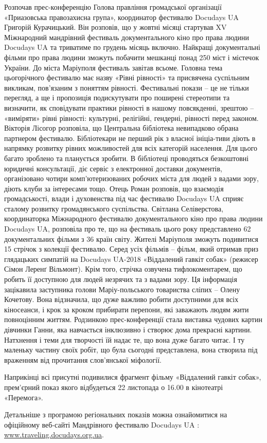 Розпочав прес-конференцію Голова правління громадської організації «Приазовська
правозахисна група», координатор фестивалю Docudays UA  Григорій Курачицький.
Він розповів, що у  жовтні місяці  стартував  XV Міжнародний  мандрівний
фестиваль документального кіно про права людини Docudays UA та триватиме по
грудень місяць включно. Найкращі документальні фільми про права людини зможуть
побачити мешканці понад 250 міст і містечок  України.  До міста Маріуполя
фестиваль завітав всьоме. Головна тема цьогорічного фестивалю має назву «Рівні
рівності» та присвячена суспільним викликам, пов'язаним з поняттям рівності.
Фестивальні покази – це не тільки перегляд, а ще і  пропозиція подискутувати
про поширені стереотипи та визначити, як сповідувати практики рівності в нашому
повсякденні, зрештою – «виміряти» рівні рівності: культурні, релігійні,
гендерні, рівності перед законом. Вікторія Лісогор розповіла, що Центральна
бібліотека невипадково обрана партнером фестивалю.  Бібліотекари не перший рік
з власної ініціа-тиви діють в напрямку розвитку рівних можливостей для всіх
категорій населення. Для цього багато зроблено та планується зробити. В
бібліотеці проводяться безкоштовні юридичні консультації, діє сервіс з
електронної доставки документів, організовано чотири комп'ютеризованих робочих
міста для людей з вадами зору, діють клуби за інтересами тощо. Отець Роман
розповів, що взаємодія громадськості, влади і духовенства під час фестивалю
Docudays UA  сприяє сталому розвитку громадянського суспільства. Світлана
Селіверстова, координаторка Міжнародного фестивалю документального кіно про
права людини Docudays UA,  розповіла про те, що на фестиваль цього року
представлено 62 документальних фільми з 36 країн світу. Жителі Маріуполя
зможуть подивитися 15 стрічок з колекції фестивалю. Серед усіх фільмів – фільм,
який отримав приз глядацьких симпатій на Docudays UA-2018 «Віддалений гавкіт
собак» (режисер Сімон Леренґ Вільмонт). Крім того, стрічка озвучена
тифлокоментарем, що робить її доступною для людей незрячих та з вадами зору. Ця
інформація зацікавила заступника голови Маріу-польського товариства сліпих –
Олену Кочетову. Вона відзначила, що дуже важливо робити доступними для всіх
кіносеанси, і крок за кроком прибирати перепони, які заважають людям жити
повноцінним життям. Родзинкою прес-конференції стала виставка чудових картин
дівчинки Ганни, яка навчається інклюзивно і створює дома прекрасні картини.
Натхнення і теми для творчості їй надає те, що вона дуже багато читає. І ту
маленьку частину своїх робіт, що була сьогодні представлена, вона створила під
враженням від прочитання слов'янської міфології. 

Наприкінці всі присутні подивилися фрагмент фільму «Віддалений гавкіт собак»,
прем'єрний показ якого відбудеться  22 листопада о 16.00 в кінотеатрі
«Перемога».

Детальніше з програмою регіональних показів можна ознайомитися на офіційному
веб-сайті Мандрівного фестивалю Docudays UA : \url{www.traveling.docudays.org.ua}.
